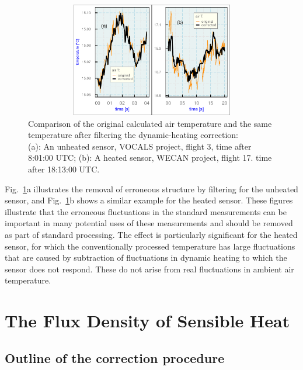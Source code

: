 \documentclass[amt, manuscript]{copernicus}
\begin{document}
\begin{figure}

\begin{center}\includegraphics[width=12cm,height=5cm]{figure/fig8} \end{center}

\caption[Comparison of the original calculated air temperature and the same temperature
after filtering the dynamic-heating correction, for an unheated sensor and a heated sensor. ]{Comparison of the original calculated air temperature and the same temperature
after filtering the dynamic-heating correction:\protect \\
(a): An unheated sensor, VOCALS project, flight 3, time after 8:01:00 UTC; (b): A heated sensor, WECAN project, flight 17. time after 18:13:00 UTC. {\label{fig:ATATF}}}
\end{figure}

Fig.~\ref{fig:ATATF}a illustrates the removal of erroneous structure by
filtering for the unheated sensor, and Fig.~\ref{fig:ATATF}b shows a
similar example for the heated sensor. These figures illustrate that the
erroneous fluctuations in the standard measurements can be important in
many potential uses of these measurements and should be removed as part
of standard processing. The effect is particularly significant for the
heated sensor, for which the conventionally processed temperature has
large fluctuations that are caused by subtraction of fluctuations in
dynamic heating to which the sensor does not respond. These do not arise
from real fluctuations in ambient air temperature.

\section{\texorpdfstring{The Flux Density of Sensible
Heat\label{sec:flux-density}}{The Flux Density of Sensible Heat}}

\subsection{\texorpdfstring{Outline of the correction
procedure\label{subsec:Outline-correction}}{Outline of the correction procedure}}
\end{document}
